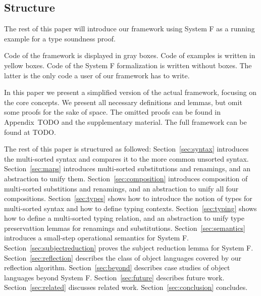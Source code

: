 \documentclass[sigplan,10pt, anonymous]{acmart}
\begin{document}
  \subsection{Structure}
  \label{sec:introduction:structure}
  The rest of this paper will introduce our framework using System F
  as a running example for a type soundness proof.

  Code of the framework is displayed in gray boxes.
  Code of examples is written in yellow boxes.
  Code of the System F formalization is written without boxes. The
  latter is the only code a user of our framework has to write.

  In this paper we present a simplified version of the actual
  framework, focusing on the core concepts. We present all necessary
  definitions and lemmas, but omit some proofs for the sake of
  space. The omitted proofs can be found in Appendix~{TODO} and the
  supplementary material. The full framework can be found at TODO.

  The rest of this paper is structured as followed:
  Section~\ref{sec:syntax} introduces the multi-sorted syntax and compares it to the
  more common unsorted syntax.
  Section~\ref{sec:maps} introduces multi-sorted substitutions and renamings, and
  an abstraction to unify them.
  Section~\ref{sec:composition} introduces composition of multi-sorted
  substitions and renamings, and an abstraction to unify all four
  compositions.
  Section~\ref{sec:types} shows how to introduce the notion of types
  for multi-sorted syntax and how to define typing contexts.
  Section~\ref{sec:typing} shows how to define a multi-sorted typing relation,
  and an abstraction to unify type preservattion lemmas for renamings and substitutions.
  Section~\ref{sec:semantics} introduces a small-step operational semantics for System F.
  Section~\ref{sec:subjectreduction} proves the subject reduction lemma for System F.
  Section~\ref{sec:reflection} describes the class of object languages covered by
  our reflection algorithm.
  Section~\ref{sec:beyond} describes case studies of object languages beyond System F.
  Section~\ref{sec:future} describes future work.
  Section~\ref{sec:related} discusses related work.
  Section~\ref{sec:conclusion} concludes.
\end{document}
